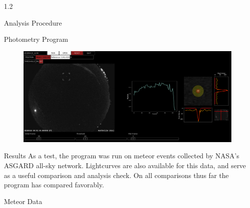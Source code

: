 \documentclass[final]{beamer}
\newlength{\twocolwid}
\begin{document}
\begin{frame}[t]
\begin{columns}[t]
\begin{column}{1.2\twocolwid}
\begin{alertblock}{Analysis Procedure}
\begin{figure}
\begin{subfigure}{.5\textwidth}
  \label{fig:gaussians}
\end{subfigure}
\end{figure}
\vspace{-2cm}
\end{alertblock}


\begin{alertblock}{Photometry Program}
\begin{figure}
	\centering
	\includegraphics[width=\linewidth]{ProgramLandscape.png}
	\label{fig:}
\end{figure}
\vspace{-1.5cm}
\end{alertblock}





\begin{block}{Results}
As a test, the program was run on meteor events collected by NASA's ASGARD all-sky network. Lightcurves are also available for this data, and serve as a useful comparison and analysis check. On all comparisons thus far the program has compared favorably. 
\end{block}

\begin{alertblock}{Meteor Data}


\end{alertblock}
\end{column}
\end{columns}
\end{frame}
\end{document}
